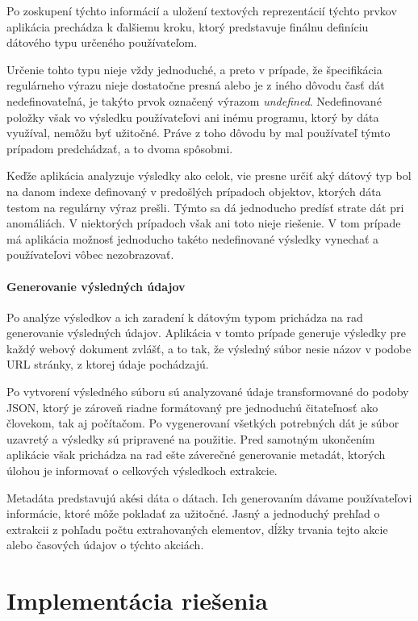 Po zoskupení týchto informácií a uložení textových reprezentácií týchto prvkov aplikácia prechádza k ďalšiemu kroku, ktorý predstavuje finálnu definíciu  dátového typu určeného používateľom.

\bigskip

Určenie tohto typu nieje vždy jednoduché, a preto v prípade, že špecifikácia regulárneho výrazu nieje dostatočne presná alebo je z iného dôvodu časť dát nedefinovateľná, je takýto prvok označený výrazom \textit{undefined}. Nedefinované položky však vo výsledku používateľovi ani inému programu, ktorý by dáta využíval, nemôžu byť užitočné. Práve z toho dôvodu by mal používateľ týmto prípadom predchádzať, a to dvoma spôsobmi. 

Keďže aplikácia analyzuje výsledky ako celok, vie presne určiť aký dátový typ bol na danom indexe definovaný v predošlých prípadoch objektov, ktorých dáta testom na regulárny výraz prešli. Týmto sa dá jednoducho predísť strate dát pri anomáliách. V niektorých prípadoch však ani toto nieje riešenie. V tom prípade má aplikácia možnosť jednoducho takéto nedefinované výsledky vynechať a používateľovi vôbec nezobrazovať.

\newpage
\subsubsection{Generovanie výsledných údajov}

Po analýze výsledkov a ich zaradení k dátovým typom prichádza na rad generovanie výsledných údajov. Aplikácia v tomto prípade generuje výsledky pre každý webový dokument zvlášť, a to tak, že výsledný súbor nesie názov v podobe URL stránky, z ktorej údaje pochádzajú.

Po vytvorení výsledného súboru sú analyzované údaje transformované do podoby JSON, ktorý je zároveň riadne formátovaný pre jednoduchú čitateľnosť ako človekom, tak aj počítačom. Po vygenerovaní všetkých potrebných dát je súbor uzavretý a výsledky sú pripravené na použitie. Pred samotným ukončením aplikácie však prichádza na rad ešte záverečné generovanie metadát, ktorých úlohou je informovať o celkových výsledkoch extrakcie.

Metadáta predstavujú akési dáta o dátach. Ich generovaním dávame používateľovi informácie, ktoré môže pokladať za užitočné. Jasný a jednoduchý prehľad o extrakcii z pohľadu počtu extrahovaných elementov, dĺžky trvania tejto akcie alebo časových údajov o týchto akciách.

\chapter{Implementácia riešenia}
\label{implementacia}

